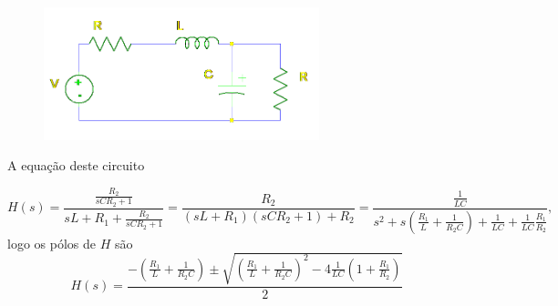 \documentclass[a4paper,12pt]{article}
\begin{document}
\begin{figure}[!ht]
\centering
\includegraphics[width=8cm]{image/circuit.png}
\end{figure}

 A equação deste circuito 

 \[H(s) = \frac{\frac{R_2}{sCR_2+1}}{sL+R_1+\frac{R_2}{sCR_2+1}} = \frac{R_2}{(sL+R_1)(sCR_2+1)+R_2}
= \frac{\frac{1}{LC}}{s^2 + s\left(\frac{R_1}{L}+\frac{1}{R_2C}\right) +
\frac{1}{LC}+\frac{1}{LC}\frac{R_1}{R_2}},\]
 logo os pólos de $H$ são
 \[H(s) =\frac{ -\left(\frac{R_1}{L}+\frac{1}{R_2C}\right) \pm
\sqrt{\left(\frac{R_1}{L}+\frac{1}{R_2C}\right)^2 - 4\frac{1}{LC}\left(1+\frac{R_1}{R_2}\right)}}{2}\]
\end{document}
